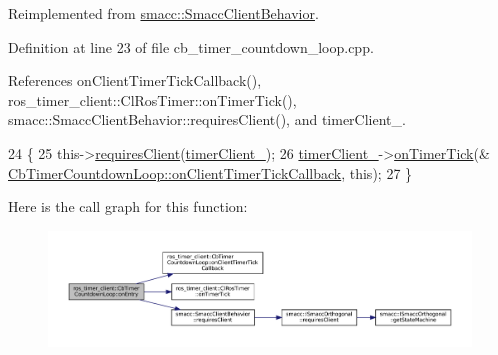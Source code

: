Reimplemented from \hyperlink{classsmacc_1_1SmaccClientBehavior_a7962382f93987c720ad432fef55b123f}{smacc\+::\+Smacc\+Client\+Behavior}.



Definition at line 23 of file cb\+\_\+timer\+\_\+countdown\+\_\+loop.\+cpp.



References on\+Client\+Timer\+Tick\+Callback(), ros\+\_\+timer\+\_\+client\+::\+Cl\+Ros\+Timer\+::on\+Timer\+Tick(), smacc\+::\+Smacc\+Client\+Behavior\+::requires\+Client(), and timer\+Client\+\_\+.


\begin{DoxyCode}
24 \{
25     this->\hyperlink{classsmacc_1_1SmaccClientBehavior_a917f001e763a1059af337bf4e164f542}{requiresClient}(\hyperlink{classros__timer__client_1_1CbTimerCountdownLoop_a71e00f5443da2a1422a58c68a5e940a4}{timerClient\_});
26     \hyperlink{classros__timer__client_1_1CbTimerCountdownLoop_a71e00f5443da2a1422a58c68a5e940a4}{timerClient\_}->\hyperlink{classros__timer__client_1_1ClRosTimer_a06ecf6427b5df59f29879ab3bd1f120c}{onTimerTick}(&
      \hyperlink{classros__timer__client_1_1CbTimerCountdownLoop_a8b3cbf593a9d3823cd1f56611fb0a0b3}{CbTimerCountdownLoop::onClientTimerTickCallback}, \textcolor{keyword}{this});
27 \}
\end{DoxyCode}
Here is the call graph for this function\+:
\nopagebreak
\begin{figure}[H]
\begin{center}
\leavevmode
\includegraphics[width=350pt]{classros__timer__client_1_1CbTimerCountdownLoop_ae547ef69c9ce8029b0f5f27120155c9f_cgraph}
\end{center}
\end{figure}
\mbox{\label{classros__timer__client_1_1CbTimerCountdownLoop_aa671fabe23945e85e65cee7a3c1e761b}} 
